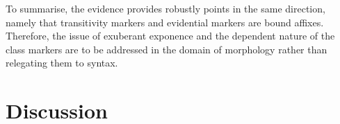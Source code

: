 \documentclass[output=paper]{langsci/langscibook}
\begin{document}
 




To summarise, the evidence \citet{Harris09} provides robustly points
in the same direction, namely that transitivity markers and
evidential markers are bound affixes. Therefore, the issue of
exuberant exponence and the dependent nature of the class markers are
to be addressed in the domain of morphology rather than relegating
them to syntax.

\section{Discussion}
\label{sec:Discussion}
\end{document}
